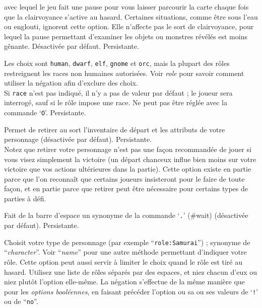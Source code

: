 \documentclass[titlepage]{article}
\begin{document}
\begin{description}[font=\mdseries\itshape]
avec lequel le jeu fait une pause pour vous laisser parcourir la carte chaque fois que la
clairvoyance s'active au hasard.
Certaines situations, comme être sous l'eau ou englouti, ignorent cette option.
Elle n'affecte pas le sort de clairvoyance, pour lequel la pause permettant d'examiner les objets
ou monstres révélés est moins gênante.
Désactivée par défaut. Persistante.
\item[race]
Les choix sont \texttt{human}, \texttt{dwarf}, \texttt{elf}, \texttt{gnome} et
\texttt{orc}, mais la plupart des rôles restreignent les races non humaines autorisées.
Voir \textit{role}
pour savoir comment utiliser la négation afin d'exclure des choix.
\\
Si \texttt{race} n'est pas indiqué, il n'y a pas de valeur par défaut ;
le joueur sera interrogé, sauf si le rôle impose une race.
Ne peut pas être réglée avec la commande `\texttt{O}'. Persistante.
\item[reroll]
Permet de retirer au sort l'inventaire de départ et les attributs de votre personnage (désactivée
par défaut). Persistante.
\\
Notez que retirer votre personnage n'est pas une façon recommandée de jouer si vous visez
simplement la victoire (un départ chanceux influe bien moins sur votre victoire
que vos actions ultérieures dans la partie). Cette option existe
en partie parce que l'on reconnaît que certains joueurs insisteront pour le faire de toute façon,
et en partie parce que retirer peut être nécessaire pour certains types de parties
à défi.
\item[rest\textunderscore on\textunderscore space]
Fait de la barre d'espace un synonyme de la commande `\texttt{.}' (\#wait) (désactivée par défaut).
Persistante.
\item[role]
Choisit votre type de personnage (par exemple ``\texttt{role:Samurai}'') ;
synonyme de ``\textit{character}''.
Voir ``\textit{name}'' pour une autre méthode permettant d'indiquer votre rôle.
Cette option peut aussi servir à limiter le choix quand le rôle est tiré
au hasard.
Utilisez une liste de rôles séparés par des espaces, et niez chacun d'eux ou niez
plutôt l'option elle-même.
La négation s'effectue de la même manière que pour les \textit{options booléennes},
en faisant précéder l'option ou sa ou ses valeurs de `\texttt{!}' ou de ``\texttt{no}''.

\end{description}
\end{document}
